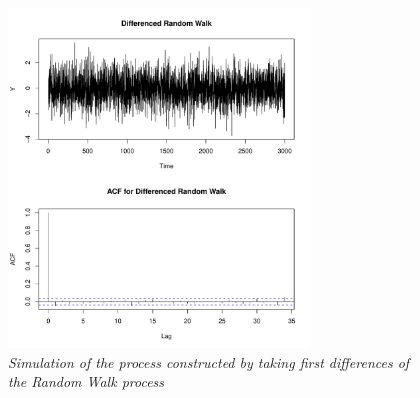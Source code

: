 \begin{figure}
    \centering
    \includegraphics[width=80mm]{random-walk-diffed.pdf}
    \caption{\textit{Simulation of the process constructed by taking first differences of the Random Walk process}}
    \label{fig:randomwalkdiffed}
\end{figure}


